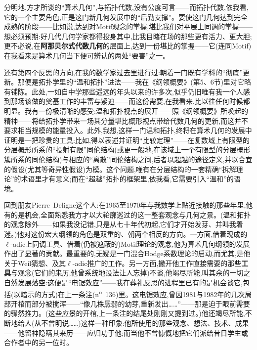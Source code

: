 分明地,方才所谈的“算术几何”,与拓扑代数,没有公度可言——而拓扑代数,依我看,它的一个主要角色,正是这门新几何发展中的“后勤支撑”。要使这门几何达到完全成熟的阶段——比如说,达到对Motif观念的掌握,堪比我们对平展上同调的掌握——想必须预期:好几代几何学家都得投身其中,比我目睹在场的那些更有活力、更大胆;更不必说,在\textbf{阿那贝尔式代数几何}的层面上,达到一份堪比的掌握——它(连同Motif)在我看来是算术几何当下便可辨认的两处“要害”之一\dmark{}。

还有第四个反思的方向,在我的数学家过去里进行过:朝着一门既有学科的“彻底”更新。那便是拓扑学里的“温和拓扑”进法——我在《纲领概要》(第5、6节)里对它略有铺陈。此处,一如自中学那些遥远的年头以来的许多次,似乎仍旧唯有我一个人感到那场该做的奠基工作的丰富与紧迫——而这份需要,在我看来,比以往任何时候都明显。我有一份极清晰的感受:温和拓扑视点的展开——照《纲领概要》所唤起的精神——将给拓扑学带来一场其分量堪比概形视点带给代数几何的更新,而这并不要求相当规模的能量投入。此外,我想,这样一门温和拓扑,终将在算术几何的发展中证明是一把珍贵的工具:比如,得以表述并证明“比较定理”——在复数域上有限型的分层概形所系的“投射有限”同伦结构(或更一般地,在该域上一个有限型的分层概形簇所系的同伦结构)与相应的“离散”同伦结构之间,后者以超越的途径定义,并以合宜的假设(尤其等奇异性假设)为模。这个问题,唯有在分层结构的一套精确“拆解理论”的术语里才有意义;而在“超越”拓扑的框架里,依我看,它需要引入“温和”的语境。

\asterisms

\dmark{}回到朋友Pierre~Deligne这个人:在1965至1970年与我数学上贴近接触的那些年里,他有的是机会,全面熟悉我方才以大轮廓巡过的这一整套观念与几何之景。(温和拓扑的观念除外——如果我没记错,只是从七十年代初起,它们才开始发芽、并叫我着迷。)他对这份宏大纲领的角色是双重的、朝两个相反的方向。一方面,借着现成的$\ell$-adic上同调工具、借着(仍被遮蔽的)Motif理论的观念,他为算术几何纲领的发展作出了显著的贡献。最重要的,无疑是一门混合Hodge系数理论的启动,而尤其,是他关于Weil猜想、及其$\ell$-adic推广的工作。另一方面,撇开他工作直接需要的那些\textbf{工具}与观念(它们的来历,他曾系统地设法让人忘掉)不谈,他竭尽所能,叫其余的一切之自然发展落空:这便是“电锯效应”——我在葬礼反思的进程里已有的是机会谈它,包括(以暗示的方式)在上一条注(n\textsuperscript{o}~136)里。这电锯效应,曾因1981与1982年的几次局部开棺而部分被搅浑——“像几株孱弱的幼芽,重新发出……”——那是迫于眼前需要的骤然推力。(这些应景的开棺,上一条注的结尾处刚刚又提到过。)他还竭尽所能,不断地给人(从不曾明说……)这样一种印象:他所使用的那些观念、想法、技术、成果——他留神隐瞒其来历——应归功于他;而当他不曾慷慨地把它们派给昔日学生或合作者中的另一位时。

